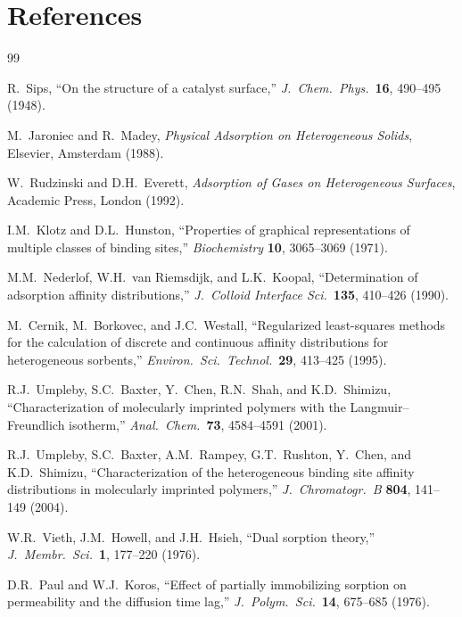 \documentclass[12pt]{article}
\begin{document}
\section*{References}

\begin{thebibliography}{99}

R.~Sips, ``On the structure of a catalyst surface,''
\textit{J.\ Chem.\ Phys.}\ \textbf{16}, 490--495 (1948).

M.~Jaroniec and R.~Madey,
\textit{Physical Adsorption on Heterogeneous Solids},
Elsevier, Amsterdam (1988).

W.~Rudzinski and D.H.~Everett,
\textit{Adsorption of Gases on Heterogeneous Surfaces},
Academic Press, London (1992).

I.M.~Klotz and D.L.~Hunston,
``Properties of graphical representations of multiple classes of
binding sites,''
\textit{Biochemistry} \textbf{10}, 3065--3069 (1971).

M.M.~Nederlof, W.H.~van Riemsdijk, and L.K.~Koopal,
``Determination of adsorption affinity distributions,''
\textit{J.\ Colloid Interface Sci.}\ \textbf{135}, 410--426 (1990).

M.~Cernik, M.~Borkovec, and J.C.~Westall,
``Regularized least-squares methods for the calculation of discrete
and continuous affinity distributions for heterogeneous sorbents,''
\textit{Environ.\ Sci.\ Technol.}\ \textbf{29}, 413--425 (1995).

R.J.~Umpleby, S.C.~Baxter, Y.~Chen, R.N.~Shah, and K.D.~Shimizu,
``Characterization of molecularly imprinted polymers with the
Langmuir--Freundlich isotherm,''
\textit{Anal.\ Chem.}\ \textbf{73}, 4584--4591 (2001).

R.J.~Umpleby, S.C.~Baxter, A.M.~Rampey, G.T.~Rushton, Y.~Chen, and
K.D.~Shimizu,
``Characterization of the heterogeneous binding site affinity
distributions in molecularly imprinted polymers,''
\textit{J.\ Chromatogr.\ B} \textbf{804}, 141--149 (2004).

W.R.~Vieth, J.M.~Howell, and J.H.~Hsieh,
``Dual sorption theory,''
\textit{J.\ Membr.\ Sci.}\ \textbf{1}, 177--220 (1976).

D.R.~Paul and W.J.~Koros,
``Effect of partially immobilizing sorption on permeability and the
diffusion time lag,''
\textit{J.\ Polym.\ Sci.}\ \textbf{14}, 675--685 (1976).


\end{thebibliography}
\end{document}
